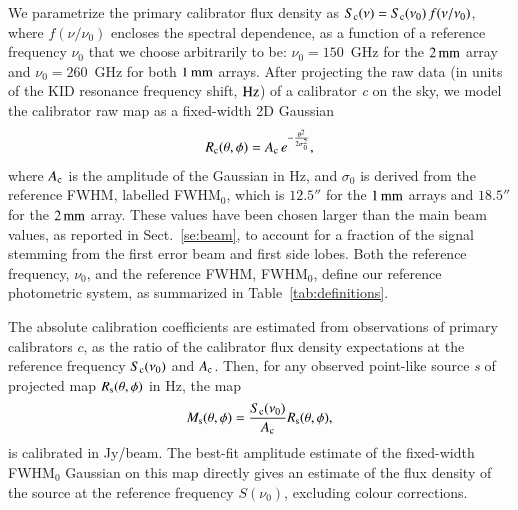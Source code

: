 \documentclass[traditionalabstract]{aa}
\newcommand{\lp}[1]{#1}
\begin{document}
We parametrize the primary calibrator flux density as 
$S_{\rm{c}}(\nu) = S_{\rm{c}}(\nu_0)\, f(\nu/\nu_{0})$, where $f(\nu/\nu_{0})$
encloses the spectral dependence, 
as a function of a reference frequency $\nu_{0}$ that we choose
arbitrarily to be: $\nu_{0} = 150$~GHz for the $2\,\rm{mm}$ array and
$\nu_{0}= 260$~GHz for both $1\,\rm{mm}$ arrays. After projecting the raw
data (in units of the KID resonance frequency shift, $\rm Hz$) of a
calibrator {\sl c} on the sky, we model the calibrator raw map as a
fixed-width 2D Gaussian
\begin{equation}
  R_{\rm{c}}(\theta, \phi)  = A_{\rm{c}} \, e^{-\frac{\theta^{2}}{2\sigma_{0}^{2}}},
  \label{eq:gaussian_amplitude}
\end{equation}
{\lp where $A_{\rm{c}}$ is the amplitude of the 
Gaussian in Hz,} and $\sigma_{0}$ is derived from the
reference FWHM, labelled FWHM$_{0}$, which is $12.5''$ for the $1\, \rm{mm}$
arrays and $18.5''$ for the $2\,\rm{mm}$ array. These values have
been chosen larger than the main beam values, as reported in
Sect.~\ref{se:beam}, to account for a fraction of the signal stemming from
the first error beam and first side lobes.
Both the reference frequency, $\nu_0$, and the reference FWHM, FWHM$_{0}$, define
our reference photometric system, as summarized in Table~\ref{tab:definitions}.

The absolute calibration coefficients are estimated from observations
of primary calibrators $c$, as the ratio of
the calibrator flux density expectations at the reference frequency
$S_{\rm{c}}(\nu_0)$ and $A_{\rm{c}}$. Then, for any observed point-like source
{\sl s} of projected map $R_{\rm{s}}(\theta,\phi)$ in Hz, the map
\begin{equation}
  M_{\rm{s}}(\theta, \phi) = \frac{S_{\rm{c}} (\nu_{0})}{A_{\rm{c}}}
  R_{\rm{s}}(\theta,\phi),
  \label{eq:pointsourcephot}
\end{equation}
is calibrated in Jy/beam. {\lp The best-fit amplitude estimate
of the fixed-width FWHM$_{0}$ Gaussian on this map directly gives an
estimate of the flux density of the source at the reference
frequency $S(\nu_{0})$, excluding colour corrections.}
\end{document}

